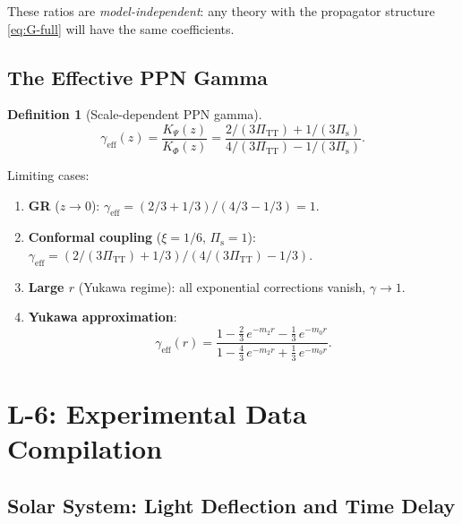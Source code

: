 \documentclass[11pt,a4paper]{article}
\theoremstyle{plain}
\theoremstyle{definition}
\newtheorem{definition}[theorem]{Definition}
\theoremstyle{remark}
\begin{document}
These ratios are \emph{model-independent}: any theory with the
propagator structure \eqref{eq:G-full} will have the same coefficients.

\subsection{The Effective PPN Gamma}

\begin{definition}[Scale-dependent PPN gamma]\label{def:gamma-eff}
\begin{equation}\label{eq:gamma-eff}
  \boxed{\gamma_{\mathrm{eff}}(z)
  = \frac{K_\Psi(z)}{K_\Phi(z)}
  = \frac{2/(3\Pi_{\mathrm{TT}}) + 1/(3\Pi_{\mathrm{s}})}
         {4/(3\Pi_{\mathrm{TT}}) - 1/(3\Pi_{\mathrm{s}})}.}
\end{equation}
\end{definition}

\noindent Limiting cases:
\begin{enumerate}[nosep]
  \item \textbf{GR} ($z \to 0$):
    $\gamma_{\mathrm{eff}} = (2/3 + 1/3)/(4/3 - 1/3) = 1$.
  \item \textbf{Conformal coupling} ($\xi = 1/6$, $\Pi_{\mathrm{s}} = 1$):
    $\gamma_{\mathrm{eff}} = (2/(3\Pi_{\mathrm{TT}}) + 1/3)
    / (4/(3\Pi_{\mathrm{TT}}) - 1/3)$.
  \item \textbf{Large $r$} (Yukawa regime):
    all exponential corrections vanish, $\gamma \to 1$.
  \item \textbf{Yukawa approximation}:
    \begin{equation}\label{eq:gamma-yukawa}
      \gamma_{\mathrm{eff}}(r)
      = \frac{1 - \frac{2}{3}\,e^{-m_2 r}
        - \frac{1}{3}\,e^{-m_0 r}}
             {1 - \frac{4}{3}\,e^{-m_2 r}
        + \frac{1}{3}\,e^{-m_0 r}}.
    \end{equation}
\end{enumerate}


\section{L-6: Experimental Data Compilation}\label{sec:experiments}

\subsection{Solar System: Light Deflection and Time Delay}
\end{document}
